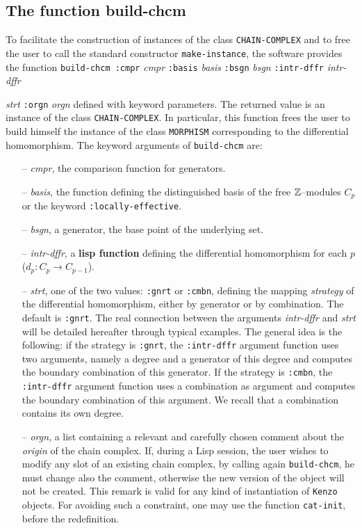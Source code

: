 \subsection {The function build-chcm}

To facilitate the construction of instances of the class {\tt CHAIN-COMPLEX} and to free the user to call
the standard constructor {\tt make-instance}, the software provides the function
\vskip 0.35cm
{\tt build-chcm :cmpr} {\em cmpr} {\tt :basis} {\em basis} {\tt :bsgn} {\em bsgn} {\tt :intr-dffr} {\em intr-dffr} \par
\hspace*{22.5mm}{\tt :strt} {\em strt} {\tt :orgn} {\em orgn}
\vskip 0.35cm 
defined with keyword parameters. The returned value is an instance of the class {\tt CHAIN-COMPLEX}.
In particular, this function frees the user to build himself
the   instance of the class {\tt MORPHISM} corresponding to the differential homomorphism. 
The keyword arguments of {\tt build-chcm} are:
\begin{itemize}
\item [--] {\em cmpr}, the comparison function for generators.
\item [--] {\em basis}, the function defining the distinguished  basis of the free
${\Bbb Z}$--modules $C_p$ or the keyword {\tt :locally-effective}.
\item [--] {\em bsgn}, a generator, the base point of the underlying set.
\item [--] {\em intr-dffr}, a {\bf lisp function} defining the differential homomorphism for each $p$
($d_p : C_p \rightarrow C_{p-1}$). 
\item [--] {\em strt}, one of the two values: {\tt :gnrt} or {\tt :cmbn}, defining the 
mapping {\em strategy} of the differential homomorphism, either by generator or by combination. 
The default is {\tt :gnrt}. The real connection between the  arguments {\em intr-dffr} and {\em strt}
will be detailed hereafter through typical examples. The general idea is the following: if the
strategy is  {\tt :gnrt}, the {\tt :intr-dffr} argument function  uses two arguments, namely
a degree and a generator of this degree and computes the boundary combination of this generator. 
If the strategy is  {\tt :cmbn}, the {\tt :intr-dffr} argument function uses a combination as argument 
and computes the boundary combination of this argument. We recall that a combination contains
its own degree.
\item [--] {\em orgn}, a list containing  a relevant and carefully chosen  comment
about the {\em origin} of the chain complex. If, during a Lisp session, the user wishes to  modify any slot
of an existing chain complex, by calling again {\tt build-chcm},
he must change also the comment, otherwise the new version of the object will not be created. This
remark is valid for any kind of instantiation of {\tt Kenzo} objects.
For avoiding such a constraint, one may use  the function {\tt cat-init}, before the redefinition.

\end{itemize}

